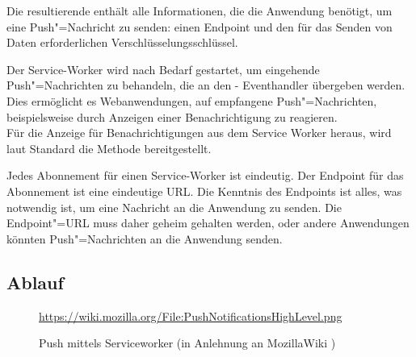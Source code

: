 Die resultierende  enthält alle Informationen, die die Anwendung benötigt, um eine Push"=Nachricht zu senden: einen Endpoint und den für das Senden von Daten erforderlichen Verschlüsselungsschlüssel.

Der Service-Worker wird nach Bedarf gestartet, um eingehende Push"=Nachrichten zu behandeln, die an den - Eventhandler übergeben werden. Dies ermöglicht es Webanwendungen, auf empfangene Push"=Nachrichten, beispielsweise durch Anzeigen einer Benachrichtigung zu reagieren. \\
Für die Anzeige für Benachrichtigungen aus dem Service Worker heraus, wird laut Standard die Methode  bereitgestellt.

Jedes Abonnement für einen Service-Worker ist eindeutig. Der Endpoint für das Abonnement ist eine eindeutige URL. Die Kenntnis des Endpoints ist alles, was notwendig ist, um eine Nachricht an die Anwendung zu senden. Die Endpoint"=URL muss daher geheim gehalten werden, oder andere Anwendungen könnten Push"=Nachrichten an die Anwendung senden.

\subsection{Ablauf}

\begin{figure}[htp] 
\caption{Push mittels Serviceworker (in Anlehnung an MozillaWiki \cite{MOZ_WIKI})}
\quelle\url{https://wiki.mozilla.org/File:PushNotificationsHighLevel.png}
\label{image_architektur-serviceworker-push}
\end{figure} 

